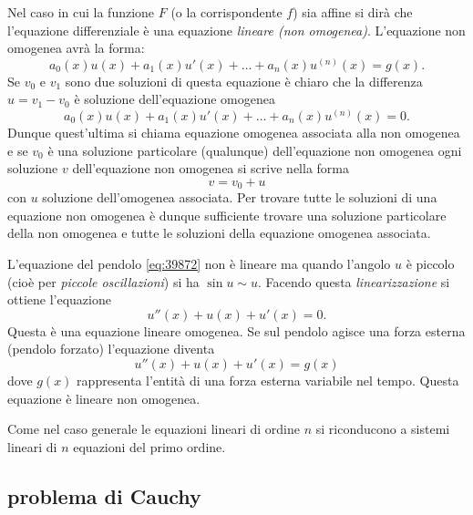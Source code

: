 Nel caso in cui la funzione $F$ (o la corrispondente $f$)
sia affine 
si dirà che l'equazione differenziale
è una equazione
%
%
\emph{lineare (non omogenea)}.
L'equazione non omogenea avrà la forma:
\[
  a_0(x) u(x) + a_1(x) u'(x) + \dots + a_n(x) u^{(n)}(x) = g(x).
\]
Se $v_0$ e $v_1$ sono due soluzioni di questa equazione è chiaro che la
differenza $u=v_1 - v_0$ è soluzione dell'equazione omogenea
\[
  a_0(x) u(x) + a_1(x) u'(x) + \dots + a_n(x) u^{(n)}(x) = 0.
\]
Dunque quest'ultima si chiama equazione omogenea associata alla non omogenea
e se $v_0$ è una soluzione particolare (qualunque) dell'equazione non omogenea
ogni soluzione $v$ dell'equazione non omogenea si scrive nella forma
\[
  v = v_0 + u
\]
con $u$ soluzione dell'omogenea associata.
Per trovare tutte le soluzioni di una equazione non omogenea è dunque
sufficiente trovare una soluzione particolare della non omogenea 
e tutte le soluzioni della equazione omogenea associata.

L'equazione del pendolo \eqref{eq:39872} non è lineare
ma quando l'angolo $u$ è piccolo (cioè per \emph{piccole oscillazioni}) si ha $\sin u \sim u$.
Facendo questa \emph{linearizzazione} si ottiene l'equazione
\[
  u''(x)  + u(x) + u'(x) = 0.
\]
Questa è una equazione lineare omogenea.
Se sul pendolo agisce una forza esterna (pendolo forzato) l'equazione diventa
\[
  u''(x) + u(x) + u'(x) = g(x)
\]
dove $g(x)$ rappresenta l'entità di una forza esterna variabile nel tempo.
Questa equazione è lineare non omogenea.

Come nel caso generale le equazioni lineari di ordine $n$ si riconducono
a sistemi lineari di $n$ equazioni del primo ordine.

\subsection{problema di Cauchy}

